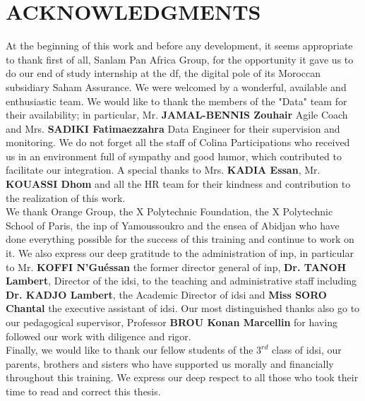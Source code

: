 \cleardoublepage
{}
{}
\chapter*{ACKNOWLEDGMENTS}

\begin{small}
At the beginning of this work and before any development, it seems appropriate to thank first of all, Sanlam Pan Africa Group, for the opportunity it gave us to do our end of study internship at the \acrfull{df}, the digital pole of its Moroccan subsidiary Saham Assurance. We were welcomed by a wonderful, available and enthusiastic team. We would like to thank the members of the "Data" team for their availability; in particular, Mr. \textbf{JAMAL-BENNIS Zouhair} Agile Coach and Mrs. \textbf{SADIKI Fatimaezzahra} Data Engineer for their supervision and monitoring. We do not forget all the staff of Colina Participations who received us in an environment full of sympathy and good humor, which contributed to facilitate our integration. A special thanks to Mrs. \textbf{KADIA Essan}, Mr. \textbf{KOUASSI Dhom} and all the HR team for their kindness and contribution to the realization of this work.  \\

We thank Orange Group, the X Polytechnic Foundation, the X Polytechnic School of Paris, the \acrfull{inp} of Yamoussoukro and the \acrfull{ensea} of Abidjan who have done everything possible for the success of this training and continue to work on it. We also express our deep gratitude to the administration of \acrshort{inp}, in particular to Mr. \textbf{KOFFI N'Guéssan}  the former director general of \acrlong{inp}, \textbf{Dr. TANOH Lambert}, Director of the \acrshort{idsi}, to the teaching and administrative staff including \textbf{Dr. KADJO Lambert}, the Academic Director of \acrshort{idsi} and \textbf{Miss SORO Chantal} the executive assistant of \acrshort{idsi}. Our most distinguished thanks also go to our pedagogical supervisor, Professor \textbf{BROU Konan Marcellin} for having followed our work with diligence and rigor. 
\\

Finally, we would like to thank our fellow students of the $3^{rd}$ class of \acrshort{idsi}, our parents, brothers and sisters who have supported us morally and financially throughout this training. We express our deep respect to all those who took their time to read and correct this thesis.

\end{small}
